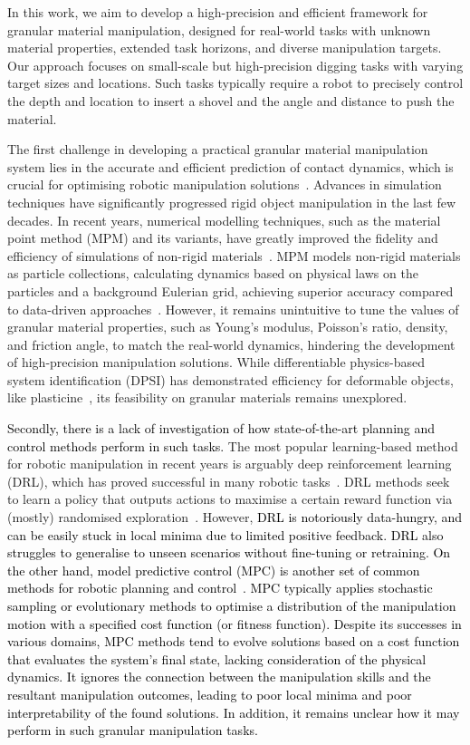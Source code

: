 \documentclass[letterpaper, 10 pt, journal, twoside]{ieeetran}
\newcommand{\rp}[1]{\textcolor{black}{#1}}
\begin{document}
In this work, we aim to develop a high-precision and efficient framework for granular material manipulation, designed for real-world tasks with unknown material properties, extended task horizons, and diverse manipulation targets. Our approach focuses on small-scale but high-precision digging tasks with varying target sizes and locations. Such tasks typically require a robot to precisely control the depth and location to insert a shovel and the angle and distance to push the material.

The first challenge in developing a practical granular material manipulation system lies in the accurate and efficient prediction of contact dynamics, which is crucial for optimising robotic manipulation solutions~\cite{kroemer2021review}. Advances in simulation techniques have significantly progressed rigid object manipulation in the last few decades. In recent years, numerical modelling techniques, such as the material point method (MPM) and its variants, have greatly improved the fidelity and efficiency of simulations of non-rigid materials~\cite{lin2022diffskill,xian2023fluidlab}. 
MPM models non-rigid materials as particle collections, calculating dynamics based on physical laws on the particles and a background Eulerian grid, achieving superior accuracy compared to data-driven approaches~\cite{hu2018moving}. However, it remains unintuitive to tune the values of granular material properties, such as Young's modulus, Poisson's ratio, density, and friction angle, to match the real-world dynamics, hindering the development of high-precision manipulation solutions. While differentiable physics-based system identification (DPSI) has demonstrated efficiency for deformable objects, like plasticine~\cite{xy2024sysid}, its feasibility on granular materials remains unexplored.

\rp{Secondly, there is a lack of investigation of how state-of-the-art planning and control methods perform in such tasks.}
The most popular learning-based method for robotic manipulation in recent years is arguably deep reinforcement learning (DRL), which has proved successful in many robotic tasks~\cite{kroemer2021review}. DRL methods seek to learn a policy that outputs actions to maximise a certain reward function via (mostly) randomised exploration~\cite{sutton2018reinforcement}. However, \rp{DRL is notoriously data-hungry, and can be easily stuck in local minima due to limited positive feedback. DRL also struggles to generalise to unseen scenarios without fine-tuning or retraining. On the other hand, model predictive control (MPC) is another set of common methods for robotic planning and control~\cite{yin2021modeling}. MPC typically applies stochastic sampling or evolutionary methods to optimise a distribution of the manipulation motion with a specified cost function (or fitness function). Despite its successes in various domains, MPC methods tend to evolve solutions based on a cost function that evaluates the system's final state, lacking consideration of the physical dynamics. It ignores the connection between the manipulation skills and the resultant manipulation outcomes, leading to poor local minima and poor interpretability of the found solutions. In addition, it remains unclear how it may perform in such granular manipulation tasks.}
\end{document}
